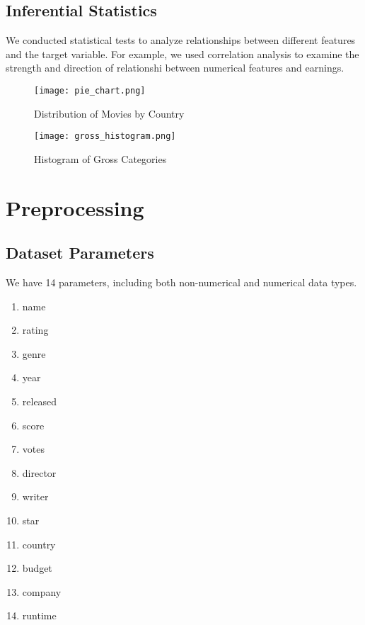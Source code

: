 \documentclass[conference]{IEEEtran}
\begin{document}
    \subsection{Inferential Statistics}
        We conducted statistical tests to analyze relationships between different features and the target variable. For example, we used correlation analysis to examine the strength and direction of  relationshi between numerical features and earnings.

    \begin{figure}[h]
        \centering
        \texttt{[image: pie\_chart.png]}
        \caption{Distribution of Movies by Country}
        \label{fig:country-pie-chart}
    \end{figure}

    \begin{figure}[h]
        \centering
        \texttt{[image: gross\_histogram.png]}
        \caption{Histogram of Gross Categories}
        \label{fig:gross-histogram}
    \end{figure}

\section{Preprocessing}
    \subsection{Dataset Parameters}
        We have 14 parameters, including both non-numerical and numerical data types.

        \begin{enumerate}
            \item name
            \item rating
            \item genre
            \item year
            \item released
            \item score
            \item votes
            \item director
            \item writer
            \item star
            \item country
            \item budget
            \item company
            \item runtime
        \end{enumerate}
\end{document}
